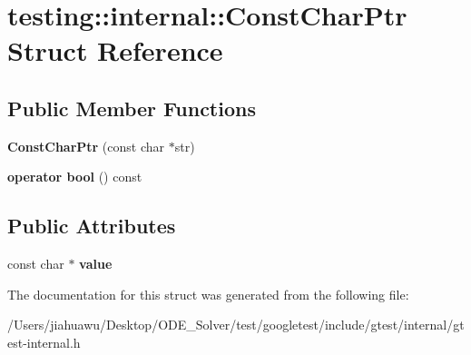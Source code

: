 \hypertarget{structtesting_1_1internal_1_1_const_char_ptr}{}\section{testing\+:\+:internal\+:\+:Const\+Char\+Ptr Struct Reference}
\label{structtesting_1_1internal_1_1_const_char_ptr}
\subsection*{Public Member Functions}
\begin{DoxyCompactItemize}
\item 
\mbox{\label{structtesting_1_1internal_1_1_const_char_ptr_ae94f6453fa679d815994eccc63062907}} 
{\bfseries Const\+Char\+Ptr} (const char $\ast$str)
\item 
\mbox{\label{structtesting_1_1internal_1_1_const_char_ptr_a85c8174b5d4db8fe96863509ba767b27}} 
{\bfseries operator bool} () const
\end{DoxyCompactItemize}
\subsection*{Public Attributes}
\begin{DoxyCompactItemize}
\item 
\mbox{\label{structtesting_1_1internal_1_1_const_char_ptr_adba40d23d5986904b605946f643cf26e}} 
const char $\ast$ {\bfseries value}
\end{DoxyCompactItemize}


The documentation for this struct was generated from the following file\+:\begin{DoxyCompactItemize}
\item 
/\+Users/jiahuawu/\+Desktop/\+O\+D\+E\+\_\+\+Solver/test/googletest/include/gtest/internal/gtest-\/internal.\+h\end{DoxyCompactItemize}
